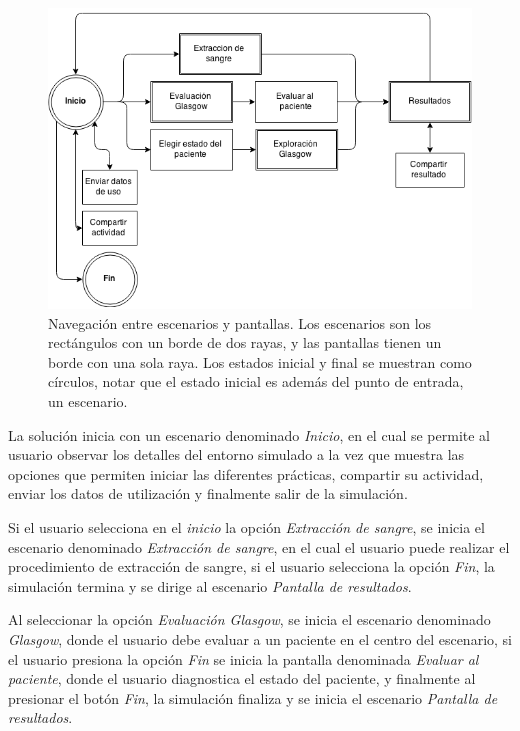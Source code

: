 \begin{figure}[H] 
\centering 
\includegraphics[scale=0.5]{propuesta/images/grafo_escenas.png}
\caption{Navegación entre escenarios y pantallas. Los escenarios son los
    rectángulos con un borde de dos rayas, y las pantallas tienen un borde con una
    sola raya. Los estados inicial y final se muestran como círculos, notar que
    el estado inicial es además del punto de entrada, un escenario.}
\label{fig:grafo_estados}
\end{figure}

La solución inicia con un escenario denominado \emph{Inicio}, en el cual se
permite al usuario observar los detalles del entorno simulado a la vez que
muestra las opciones que permiten iniciar las diferentes prácticas, compartir
su actividad, enviar los datos de utilización y finalmente salir de la
simulación.

Si el usuario selecciona en el \emph{inicio} la opción \emph{Extracción de
    sangre}, se inicia el escenario denominado \emph{Extracción de sangre}, en
el cual el usuario puede realizar el procedimiento de extracción de sangre, si
el usuario selecciona la opción \emph{Fin}, la simulación termina y se dirige 
al escenario \emph{Pantalla de resultados}.

Al seleccionar la opción \emph{Evaluación Glasgow}, se inicia el escenario
denominado \emph{Glasgow}, donde el usuario debe evaluar a un paciente en el
centro del escenario, si el usuario presiona la opción \emph{Fin} se inicia la
pantalla denominada \emph{Evaluar al paciente}, donde el usuario diagnostica el
estado del paciente, y finalmente al presionar el botón \emph{Fin}, la
simulación finaliza y se inicia el escenario \emph{Pantalla de resultados}.

